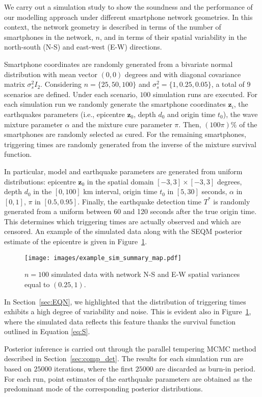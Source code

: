 \documentclass[final]{statsoc}
\begin{document}
We carry out a simulation study to show the soundness and the performance of our modelling approach under different smartphone network geometries. In this context, the network geometry is described in terms of the number of smartphones in the network, $n$, and in terms of their spatial variability in the north-south (N-S) and east-west (E-W) directions. 

Smartphone coordinates are randomly generated from a bivariate normal distribution with mean vector $(0,0)$ degrees and with diagonal covariance matrix $\sigma^2_s I_2$. Considering $n=\{25,50,100\}$ and $\sigma^2_s=\{1,0.25,0.05\}$, a total of 9 scenarios are defined. Under each scenario, $100$ simulation runs are executed. 
For each simulation run we randomly generate the smartphone coordinates $\mathbf{z}_i$, the earthquakes parameters (i.e., epicentre $\mathbf{z}_{0}$, depth $d_{0}$ and origin time $t_{0}$), the wave mixture parameter $\alpha$ and the  mixture cure parameter $\pi$. Then, $(100\pi)\%$ of the smartphones are randomly selected as cured. For the remaining smartphones, triggering times are randomly generated from the inverse of the mixture survival function. 

In particular, model and earthquake parameters are generated from uniform distributions: epicentre $\mathbf{z}_{0}$ in the spatial domain $[-3,3]\times[-3,3]$ degrees, depth $d_{0}$ in the $[0,100]$ km interval, origin time $t_{0}$ in $[5,30]$ seconds, $\alpha$ in $[0,1]$, $\pi$ in $[0.5,0.95]$. Finally, the earthquake detection time $T^{*}$ is randomly generated from a uniform between 60 and 120 seconds after the true origin time. This determines which triggering times are actually observed and which are censored. An example of the simulated data along with the SEQM posterior estimate of the epicentre is given in Figure~\ref{fig:sim_map}.
%
\begin{figure}[htbp!]
    \centering
    \texttt{[image: images/example\_sim\_summary\_map.pdf]}
    \caption{$n=100$ simulated data with network N-S and E-W spatial variances equal to $(0.25,1)$.}
    \label{fig:sim_map}
\end{figure}
%
In Section~\ref{sec:EQN}, we highlighted that the distribution of triggering times exhibits a high degree of variability and noise. This is evident also in Figure~\ref{fig:sim_map}, where the simulated data reflects this feature thanks %
the survival function outlined in Equation \eqref{eq:S}.

Posterior inference is carried out through the parallel tempering MCMC method described in Section~\ref{sec:comp_det}. The results for each simulation run are based on $25000$ iterations, where  the first $25000$ are discarded as burn-in period. For each run, point estimates of the earthquake parameters are obtained as the predominant mode of the corresponding posterior distributions.
\end{document}
